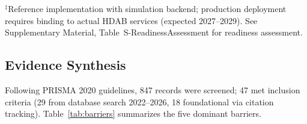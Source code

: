 \documentclass[conference]{IEEEtran}
\begin{document}
\begin{table}[htbp]
\centering
\caption{Framework Comparison: FL-EHDS vs Existing FL Frameworks}
\label{tab:framework_comparison}

\vspace{1mm}
\footnotesize{$^\ddagger$Reference implementation with simulation backend; production deployment requires binding to actual HDAB services (expected 2027--2029). See Supplementary Material, Table~S-ReadinessAssessment for readiness assessment.}
\end{table}

\subsection{Evidence Synthesis}

Following PRISMA 2020 guidelines, 847 records were screened; 47 met inclusion criteria (29 from database search 2022--2026, 18 foundational via citation tracking). Table~\ref{tab:barriers} summarizes the five dominant barriers.
\end{document}
